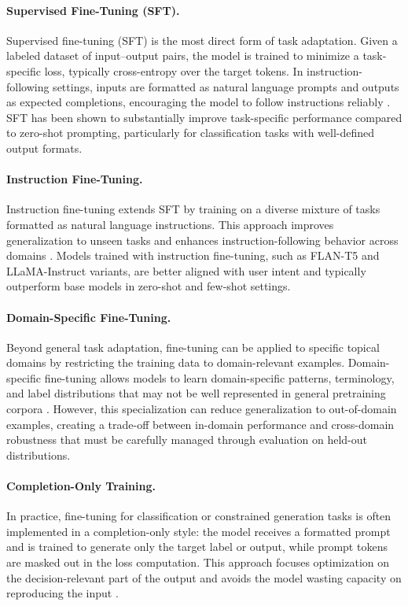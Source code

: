\paragraph{Supervised Fine-Tuning (SFT).}
Supervised fine-tuning (SFT) is the most direct form of task adaptation. Given a labeled dataset of input--output pairs, the model is trained to minimize a task-specific loss, typically cross-entropy over the target tokens. In instruction-following settings, inputs are formatted as natural language prompts and outputs as expected completions, encouraging the model to follow instructions reliably \cite{zhao2025surveylargelanguagemodels}. SFT has been shown to substantially improve task-specific performance compared to zero-shot prompting, particularly for classification tasks with well-defined output formats.

\paragraph{Instruction Fine-Tuning.}
Instruction fine-tuning extends SFT by training on a diverse mixture of tasks formatted as natural language instructions. This approach improves generalization to unseen tasks and enhances instruction-following behavior across domains \cite{naveed2024comprehensiveoverviewlargelanguage}. Models trained with instruction fine-tuning, such as FLAN-T5 and LLaMA-Instruct variants, are better aligned with user intent and typically outperform base models in zero-shot and few-shot settings.

\paragraph{Domain-Specific Fine-Tuning.}
Beyond general task adaptation, fine-tuning can be applied to specific topical domains by restricting the training data to domain-relevant examples. Domain-specific fine-tuning allows models to learn domain-specific patterns, terminology, and label distributions that may not be well represented in general pretraining corpora \cite{lu2024finetuninglargelanguagemodels}. However, this specialization can reduce generalization to out-of-domain examples, creating a trade-off between in-domain performance and cross-domain robustness that must be carefully managed through evaluation on held-out distributions.

\paragraph{Completion-Only Training.}
In practice, fine-tuning for classification or constrained generation tasks is often implemented in a completion-only style: the model receives a formatted prompt and is trained to generate only the target label or output, while prompt tokens are masked out in the loss computation. This approach focuses optimization on the decision-relevant part of the output and avoids the model wasting capacity on reproducing the input \cite{naveed2024comprehensiveoverviewlargelanguage}.

